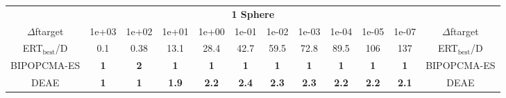 \begin{tabular}{cccccccccccc}
 & \multicolumn{10}{c}{{\normalsize \textbf{1 Sphere}}}\\
$\Delta$ftarget& 1e+03& 1e+02& 1e+01& 1e+00& 1e-01& 1e-02& 1e-03& 1e-04& 1e-05& 1e-07 & $\Delta$ftarget \\
ERT$_{\textrm{best}}$/D& 0.1& 0.38& 13.1& 28.4& 42.7& 59.5& 72.8& 89.5& 106& 137 & ERT$_{\textrm{best}}$/D \\
\hline
BIPOPCMA-ES & \textbf{1} & \textbf{2} & \textbf{1} & \textbf{1} & \textbf{1} & \textbf{1} & \textbf{1} & \textbf{1} & \textbf{1} & \textbf{1} & BIPOPCMA-ES \cite{add_an_entry_for_BIPOPCMA-ES_in_bbob.bib}\\
DEAE & \textbf{1} & \textbf{1} & \textbf{1.9} & \textbf{2.2} & \textbf{2.4} & \textbf{2.3} & \textbf{2.3} & \textbf{2.2} & \textbf{2.2} & \textbf{2.1} & DEAE \cite{add_an_entry_for_DEAE_in_bbob.bib}
\end{tabular}
